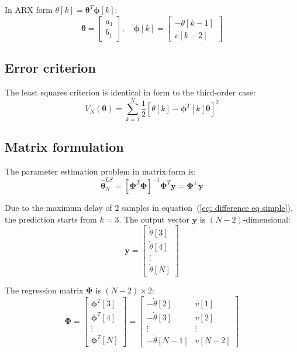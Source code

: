 \documentclass{article}
\begin{document}
	In ARX form $\dot{\theta}[k] = \boldsymbol{\theta}^T \boldsymbol{\phi}[k]$:
	\begin{equation}
		\boldsymbol{\theta} = \begin{bmatrix} a_1 \\ b_1 \end{bmatrix}, \quad
		\boldsymbol{\phi}[k] = \begin{bmatrix} -\dot{\theta}[k-1] \\ v[k-2] \end{bmatrix}
	\end{equation}
	
	\subsection*{Error criterion}
	
	The least squares criterion is identical in form to the third-order case:
	\begin{equation}
		V_N(\boldsymbol{\theta}) = \sum ^N _{k=1}  \frac{1}{2} [\dot{\theta}[k] - \boldsymbol{\phi}^T[k] \boldsymbol{\theta}]^2
	\end{equation}
	
	\subsection*{Matrix formulation}
	
	The parameter estimation problem in matrix form is:
	\begin{equation}
		\hat{\boldsymbol{\theta}}^{LS}_N = [\boldsymbol{\Phi}^T \boldsymbol{\Phi}]^{-1} \boldsymbol{\Phi}^T \boldsymbol{y} = \boldsymbol{\Phi}^+ \boldsymbol{y}
	\end{equation}
	
	Due to the maximum delay of 2 samples in equation~(\ref{eq: difference eq simple}), the prediction starts from $k = 3$. The output vector $\boldsymbol{y}$ is $(N-2)$-dimensional:
	\begin{equation}
		\boldsymbol{y} = \begin{bmatrix}
			\dot{\theta}[3] \\ \dot{\theta}[4] \\ \vdots \\ \dot{\theta}[N]
		\end{bmatrix}
	\end{equation}
	
	The regression matrix $\boldsymbol{\Phi}$ is $(N-2) \times 2$:
	\begin{equation}
		\boldsymbol{\Phi} = \begin{bmatrix}
			\boldsymbol{\phi}^T[3] \\
			\boldsymbol{\phi}^T[4] \\
			\vdots \\
			\boldsymbol{\phi}^T[N]
		\end{bmatrix} = \begin{bmatrix}
			-\dot{\theta}[2] & v[1] \\
			-\dot{\theta}[3] & v[2] \\
			\vdots & \vdots \\
			-\dot{\theta}[N-1] & v[N-2]
		\end{bmatrix}
	\end{equation}
	
\end{document}

